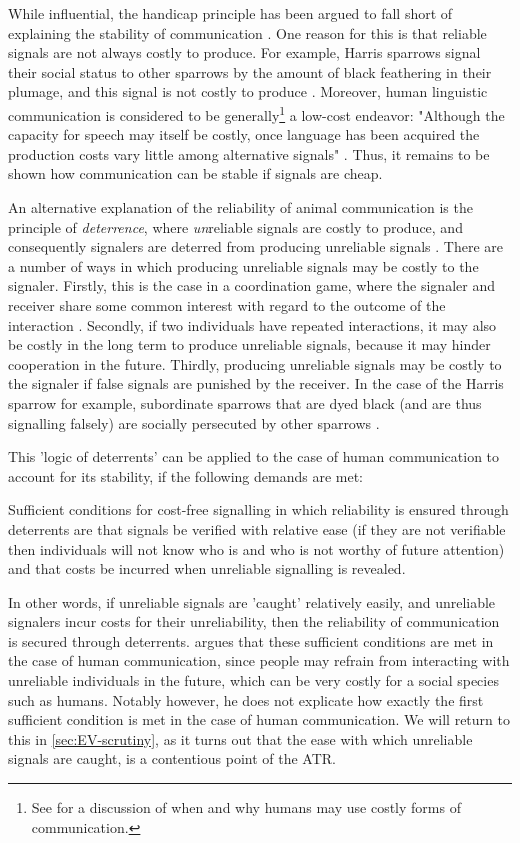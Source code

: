 While influential, the handicap principle has been argued to fall short of explaining the stability of communication \citep{Penn20, Scott-Phillips08}.
One reason for this is that reliable signals are not always costly to produce. For example, Harris sparrows signal their social status to other sparrows by the amount of black feathering in their plumage, and this signal is not costly to produce \citep[p.~13191]{Lachmann01}.
Moreover, human linguistic communication is considered to be generally\footnote{See \citet[p.~13193]{Lachmann01} for a discussion of when and why humans may use costly forms of communication.} a low-cost endeavor: "Although the capacity for speech may itself be costly, once language has been acquired the production costs vary little among alternative signals" \citep[p.~13192]{Lachmann01}.
Thus, it remains to be shown how communication can be stable if signals are cheap.

An alternative explanation of the reliability of animal communication is the principle of \emph{deterrence}, where \emph{un}reliable signals are costly to produce, and consequently signalers are deterred from producing unreliable signals \citep{Scott-Phillips08}.
There are a number of ways in which producing unreliable signals may be costly to the signaler. Firstly, this is the case in a coordination game, where the signaler and receiver share some common interest with regard to the outcome of the interaction \citep[see][]{Smith94}.
Secondly, if two individuals have repeated interactions, it may also be costly in the long term to produce unreliable signals, because it may hinder cooperation in the future.
Thirdly, producing unreliable signals may be costly to the signaler if false signals are punished by the receiver. In the case of the Harris sparrow for example, subordinate sparrows that are dyed black (and are thus signalling falsely) are socially persecuted by other sparrows \citep{Rohwer78}.

This 'logic of deterrents' can be applied to the case of human communication to account for its stability, if the following demands are met:
\begin{quoting}
    Sufficient conditions for cost-free signalling in which reliability is ensured through deterrents are that signals be verified with relative ease (if they are not verifiable then individuals will not know who is and who is not worthy of future attention) and that costs be incurred when unreliable signalling is revealed.
    \hfill \citep[p.~279]{Scott-Phillips08}
\end{quoting}
In other words, if unreliable signals are 'caught' relatively easily, and unreliable signalers incur costs for their unreliability, then the reliability of communication is secured through deterrents.
\citet{Scott-Phillips08} argues that these sufficient conditions are met in the case of human communication, since people may refrain from interacting with unreliable individuals in the future, which can be very costly for a social species such as humans.
Notably however, he does not explicate how exactly the first sufficient condition is met in the case of human communication. We will return to this in \cref{sec:EV-scrutiny}, as it turns out that the ease with which unreliable signals are caught, is a contentious point of the ATR.

